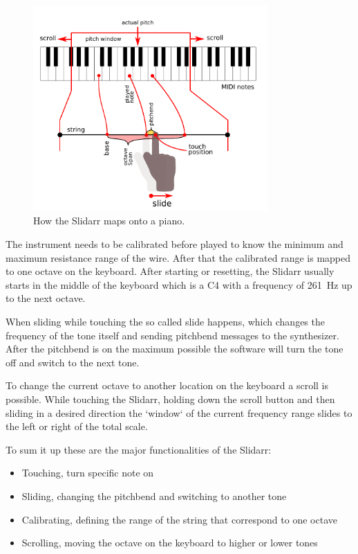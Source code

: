 \documentclass{article}
\begin{document}
\begin{figure}[ht]
  \centering
  \includegraphics[width=0.8\textwidth]{slidar_illustration}
  \caption{How the Slidarr maps onto a piano.}
  \label{fig:slidarr}
\end{figure}


The instrument needs to be calibrated before played to know the minimum and maximum resistance range of the wire. After that the calibrated range is mapped to one octave on the keyboard. After starting or resetting, the Slidarr usually starts in the middle of the keyboard which is a C4 with a frequency of \SI{261}{\hertz} up to the next octave.

When sliding while touching the so called slide happens, which changes the frequency of the tone itself and sending pitchbend messages to the synthesizer. After the pitchbend is on the maximum possible the software will turn the tone off and switch to the next tone.

To change the current octave to another location on the keyboard a scroll is possible. While touching the Slidarr, holding down the scroll button and then sliding in a desired direction the `window` of the current frequency range slides to the left or right of the total scale.

To sum it up these are the major functionalities of the Slidarr:
\begin{itemize}
 \item Touching, turn specific note on
 \item Sliding, changing the pitchbend and switching to another tone
 \item Calibrating, defining the range of the string that correspond to one octave
 \item Scrolling, moving the octave on the keyboard to higher or lower tones
\end{itemize}
\end{document}
